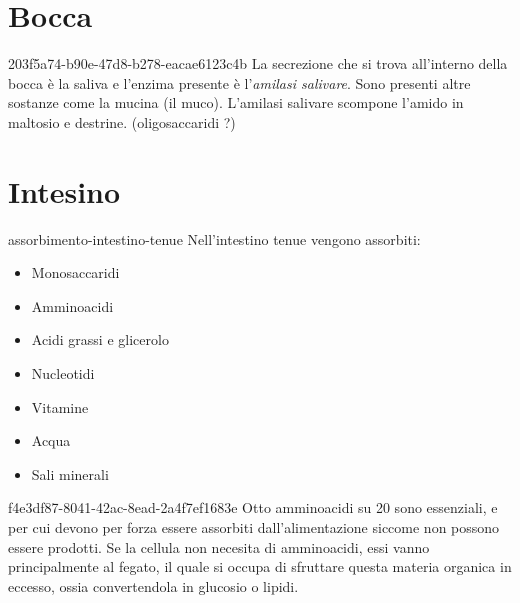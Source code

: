 \documentclass[preview]{standalone}
\begin{document}
\section{Bocca}

\begin{snippet}{203f5a74-b90e-47d8-b278-eacae6123c4b}
    La secrezione che si trova all'interno della bocca è la saliva e l'enzima
    presente è l'\textit{amilasi salivare}.
    Sono presenti altre sostanze come la mucina (il muco).
    L'amilasi salivare scompone l'amido in maltosio e destrine. (oligosaccaridi ?)
\end{snippet}


\section{Intesino}


\begin{snippet}{assorbimento-intestino-tenue}
    Nell'intestino tenue vengono assorbiti:
    \begin{itemize}
       \item Monosaccaridi
       \item Amminoacidi
       \item Acidi grassi e glicerolo
       \item Nucleotidi
       \item Vitamine
       \item Acqua
       \item Sali minerali
    \end{itemize}
\end{snippet}





\begin{snippet}{f4e3df87-8041-42ac-8ead-2a4f7ef1683e}
    Otto amminoacidi su 20 sono essenziali, e per cui devono per forza essere assorbiti dall'alimentazione
siccome non possono essere prodotti. 
Se la cellula non necesita di amminoacidi, essi vanno principalmente al fegato, il quale si occupa
di sfruttare questa materia organica in eccesso, ossia convertendola in glucosio o lipidi.
\end{snippet}
\end{document}
